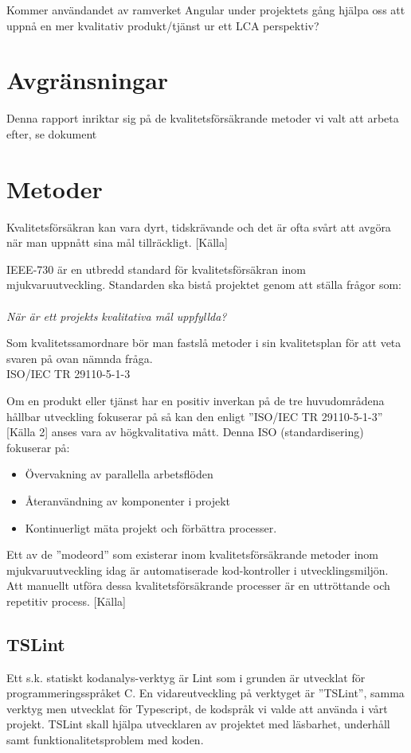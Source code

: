 Kommer användandet av ramverket Angular under projektets gång hjälpa oss att uppnå en mer kvalitativ produkt/tjänst ur ett LCA perspektiv?

\section{Avgränsningar}
Denna rapport inriktar sig på de kvalitetsförsäkrande metoder vi valt att arbeta efter, se dokument %

\section{Metoder}

Kvalitetsförsäkran kan vara dyrt, tidskrävande och det är ofta svårt att avgöra när man uppnått sina mål tillräckligt. [Källa]

IEEE-730 är en utbredd standard för kvalitetsförsäkran inom mjukvaruutveckling. Standarden ska bistå projektet genom att ställa frågor som:
\\ \\
\emph{När är ett projekts kvalitativa mål uppfyllda?}

Som kvalitetssamordnare bör man fastslå metoder i sin kvalitetsplan för att veta svaren på ovan nämnda fråga. \\

ISO/IEC TR 29110-5-1-3

Om en produkt eller tjänst har en positiv inverkan på de tre huvudområdena hållbar utveckling fokuserar på så kan den enligt ”ISO/IEC TR 29110-5-1-3” [Källa 2] anses vara av högkvalitativa mått.  Denna ISO (standardisering) fokuserar på: 

\begin{itemize}
	\item Övervakning av parallella arbetsflöden
	\item Återanvändning av komponenter i projekt
	\item Kontinuerligt mäta projekt och förbättra processer.
\end{itemize}

Ett av de ”modeord” som existerar inom kvalitetsförsäkrande metoder inom mjukvaruutveckling idag är automatiserade kod-kontroller i utvecklingsmiljön. Att manuellt utföra dessa kvalitetsförsäkrande processer är en uttröttande och repetitiv process. [Källa]
\subsection{TSLint}
Ett s.k. statiskt kodanalys-verktyg är Lint som i grunden är utvecklat för programmeringsspråket C. En vidareutveckling på verktyget är ”TSLint”, samma verktyg men utvecklat för Typescript, de kodspråk vi valde att använda i vårt projekt. TSLint skall hjälpa utvecklaren av projektet med läsbarhet, underhåll samt funktionalitetsproblem med koden.

